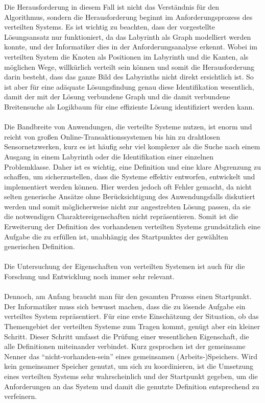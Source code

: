 \documentclass[../vs-script-first-v01.tex]{subfiles}
\begin{document}
Die Herausforderung in diesem Fall ist nicht das Verständnis für den Algorithmus, sondern die Herausforderung beginnt im Anforderungsprozess des verteilten Systems. Es ist wichtig zu beachten, dass der vorgestellte Lösungsansatz nur funktioniert, da das Labyrinth als Graph modelliert werden konnte, und der Informatiker dies in der Anforderungsanalyse erkennt. Wobei im verteilten System die Knoten als Positionen im Labyrinth und die Kanten, als  möglichen Wege, willkürlich verteilt sein können und somit die Herausforderung darin besteht, dass das ganze Bild des Labyrinths nicht direkt ersichtlich ist. So ist aber für eine adäquate Lösungsfindung genau diese Identifikation wesentlich, damit der mit der Lösung verbundene Graph und die damit verbundene Breitensuche als Logikbaum für eine effiziente Lösung identifiziert werden kann. 
\\\\
Die Bandbreite von Anwendungen, die verteilte Systeme nutzen, ist enorm und reicht von großen Online-Transaktionssystemen bis hin zu drahtlosen Sensornetzwerken, kurz es ist häufig sehr viel komplexer als die Suche nach einem Ausgang in einem Labyrinth oder die Identifikation einer einzelnen Problemklasse. Daher ist es wichtig, eine Definition und eine klare Abgrenzung zu schaffen, um sicherzustellen, dass die Systeme effektiv entworfen, entwickelt und implementiert werden können. Hier werden jedoch oft Fehler gemacht, da nicht selten generische Ansätze ohne Berücksichtigung des Anwendungsfalls diskutiert werden und somit möglicherweise nicht zur angestrebten Lösung passen, da sie die notwendigen Charaktereigenschaften nicht repräsentieren. Somit ist die Erweiterung der Definition des vorhandenen verteilten Systems grundsätzlich eine Aufgabe die zu erfüllen ist, unabhängig des Startpunktes der gewählten generischen Definition.
\\\\
Die Untersuchung der Eigenschaften von verteilten Systemen ist auch für die Forschung und Entwicklung noch immer sehr relevant.
\\\\
Dennoch, am Anfang braucht man für den gesamten Prozess einen Startpunkt. Der Informatiker muss sich bewusst machen, dass die zu lösende Aufgabe ein verteiltes System repräsentiert. Für eine erste Einschätzung der Situation, ob das Themengebiet der verteilten Systeme zum Tragen kommt, genügt aber ein kleiner Schritt. Dieser Schritt umfasst die Prüfung einer wesentlichen Eigenschaft, die alle Definitionen miteinander verbindet.  Kurz gesprochen ist der gemeinsame Nenner das \enquote{nicht-vorhanden-sein} eines gemeinsamen (Arbeits-)Speichers. Wird kein gemeinsamer Speicher genutzt, um sich zu koordinieren, ist die Umsetzung eines verteilten Systems sehr wahrscheinlich und der Startpunkt gegeben, um die Anforderungen an das System und damit die genutzte Definition entsprechend zu verfeinern.
\end{document}
